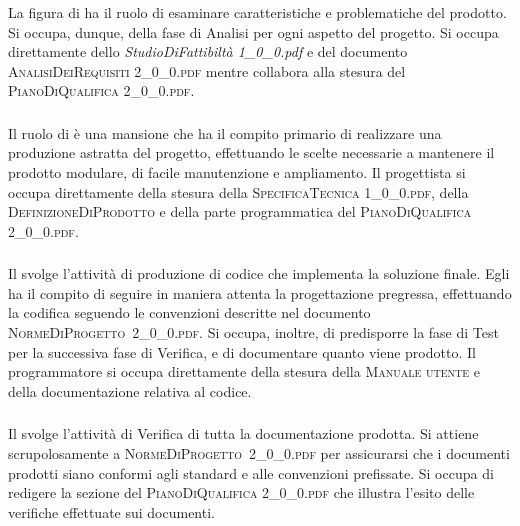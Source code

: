 		\subsubsection{\Ana}
		La figura di \textit{\Ana} ha il ruolo di esaminare caratteristiche e problematiche del prodotto. Si occupa, dunque, della fase di Analisi per ogni aspetto del progetto. Si occupa direttamente dello \textit{StudioDiFattibiltà 1\_0\_0.pdf} e del documento \textsc{AnalisiDeiRequisiti 2\_0\_0.pdf} mentre collabora alla stesura del \textsc{PianoDiQualifica 2\_0\_0.pdf}.

		\subsubsection{\Prog}
		Il ruolo di \textit{\Prog} è una mansione che ha il compito primario di realizzare una produzione astratta del progetto, effettuando le scelte necessarie a mantenere il prodotto modulare, di facile manutenzione e ampliamento. Il progettista si occupa direttamente della stesura della \textsc{SpecificaTecnica 1\_0\_0.pdf}, della \textsc{DefinizioneDiProdotto} e della parte programmatica del \textsc{PianoDiQualifica 2\_0\_0.pdf}.
		
		\subsubsection{\Progr}
		Il \textit{\Progr} svolge l'attività di produzione di codice che implementa la soluzione finale. Egli ha il compito di seguire in maniera attenta la progettazione pregressa, effettuando la codifica seguendo le convenzioni descritte nel documento \hbox{\textsc{NormeDiProgetto 2\_0\_0.pdf}}. Si occupa, inoltre, di predisporre la fase di Test per la successiva fase di Verifica, e di documentare quanto viene prodotto.
		Il programmatore si occupa direttamente della stesura della \textsc{Manuale utente } e della documentazione relativa al codice.
		
		\subsubsection{\Ver}
		Il \textit{\Ver} svolge l'attività di Verifica di tutta la documentazione prodotta. Si attiene scrupolosamente a \hbox{\textsc{NormeDiProgetto 2\_0\_0.pdf}} per assicurarsi che i documenti prodotti siano conformi agli standard e alle convenzioni prefissate. Si occupa di redigere la sezione del \textsc{PianoDiQualifica 2\_0\_0.pdf} che illustra l'esito delle verifiche effettuate sui documenti.

